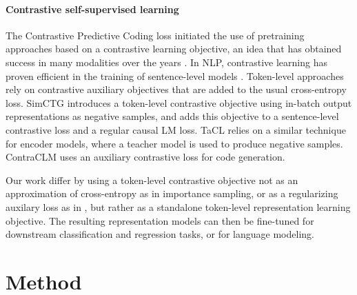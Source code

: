 \paragraph{Contrastive self-supervised learning}
The Contrastive Predictive Coding loss \citep{oord2019representation} initiated the use of pretraining approaches based on a contrastive learning objective, an idea that has obtained success in many modalities over the years \citep{sermanet2018timecontrastive,schneider19_interspeech, wav2vec2,algayres-etal-2022-dp}. 
%
In NLP, contrastive learning has proven efficient in the training of sentence-level models \citep{gao-etal-2021-simcse, yan-etal-2021-consert, klein-nabi-2023-micse}. Token-level approaches rely on contrastive auxiliary objectives that are added to the usual cross-entropy loss. SimCTG \citep{su2022contrastive} introduces a token-level contrastive objective using in-batch output representations as negative samples, and adds this objective to a sentence-level contrastive loss and a regular causal LM loss. TaCL \citep{su-etal-2022-tacl} relies on a similar technique for encoder models, where a teacher model is used to produce negative samples. ContraCLM \citep{jain-etal-2023-contraclm} uses an auxiliary contrastive loss for code generation.

Our work differ by using a token-level contrastive objective not as an approximation of cross-entropy as in importance sampling, or as a regularizing auxilary loss as in \citet{su2022contrastive}, but rather as a standalone token-level representation learning objective. The resulting representation models can then be fine-tuned for downstream classification and regression tasks, or for language modeling.



\section{Method}
